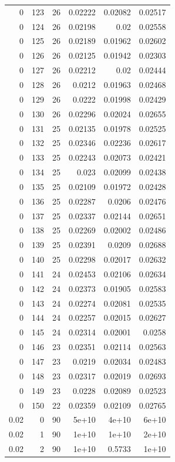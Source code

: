 \begin{tabular}{rrrrrr}
0 & 123 & 26 & 0.02222 & 0.02082 & 0.02517 \\
0 & 124 & 26 & 0.02198 & 0.02 & 0.02558 \\
0 & 125 & 26 & 0.02189 & 0.01962 & 0.02602 \\
0 & 126 & 26 & 0.02125 & 0.01942 & 0.02303 \\
0 & 127 & 26 & 0.02212 & 0.02 & 0.02444 \\
0 & 128 & 26 & 0.0212 & 0.01963 & 0.02468 \\
0 & 129 & 26 & 0.0222 & 0.01998 & 0.02429 \\
0 & 130 & 26 & 0.02296 & 0.02024 & 0.02655 \\
0 & 131 & 25 & 0.02135 & 0.01978 & 0.02525 \\
0 & 132 & 25 & 0.02346 & 0.02236 & 0.02617 \\
0 & 133 & 25 & 0.02243 & 0.02073 & 0.02421 \\
0 & 134 & 25 & 0.023 & 0.02099 & 0.02438 \\
0 & 135 & 25 & 0.02109 & 0.01972 & 0.02428 \\
0 & 136 & 25 & 0.02287 & 0.0206 & 0.02476 \\
0 & 137 & 25 & 0.02337 & 0.02144 & 0.02651 \\
0 & 138 & 25 & 0.02269 & 0.02002 & 0.02486 \\
0 & 139 & 25 & 0.02391 & 0.0209 & 0.02688 \\
0 & 140 & 25 & 0.02298 & 0.02017 & 0.02632 \\
0 & 141 & 24 & 0.02453 & 0.02106 & 0.02634 \\
0 & 142 & 24 & 0.02373 & 0.01905 & 0.02583 \\
0 & 143 & 24 & 0.02274 & 0.02081 & 0.02535 \\
0 & 144 & 24 & 0.02257 & 0.02015 & 0.02627 \\
0 & 145 & 24 & 0.02314 & 0.02001 & 0.0258 \\
0 & 146 & 23 & 0.02351 & 0.02114 & 0.02563 \\
0 & 147 & 23 & 0.0219 & 0.02034 & 0.02483 \\
0 & 148 & 23 & 0.02317 & 0.02019 & 0.02693 \\
0 & 149 & 23 & 0.0228 & 0.02089 & 0.02523 \\
0 & 150 & 22 & 0.02359 & 0.02109 & 0.02765 \\
0.02 & 0 & 90 & 5e+10 & 4e+10 & 6e+10 \\
0.02 & 1 & 90 & 1e+10 & 1e+10 & 2e+10 \\
0.02 & 2 & 90 & 1e+10 & 0.5733 & 1e+10 \\

\end{tabular}
